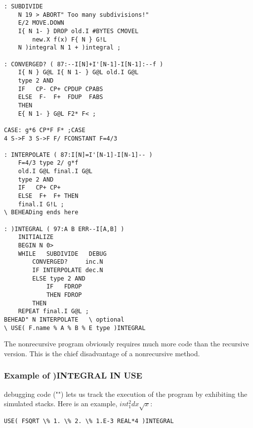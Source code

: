 \begin{lstlisting}
: SUBDIVIDE
    N 19 > ABORT" Too many subdivisions!"
    E/2 MOVE.DOWN
    I{ N 1- } DROP old.I #BYTES CMOVEL
        new.X f(x) F{ N } G!L
    N )integral N 1 + )integral ;

: CONVERGED? ( 87:--I[N]+I'[N-1]-I[N-1]:--f )
    I{ N } G@L I{ N 1- } G@L old.I G@L
    type 2 AND
    IF   CP- CP+ CPDUP CPABS
    ELSE  F-  F+  FDUP  FABS
    THEN
    E{ N 1- } G@L F2* F< ;

CASE: g*6 CP*F F* ;CASE
4 S->F 3 S->F F/ FCONSTANT F=4/3

: INTERPOLATE ( 87:I[N]=I'[N-1]-I[N-1]-- )
    F=4/3 type 2/ g*f
    old.I G@L final.I G@L
    type 2 AND
    IF   CP+ CP+
    ELSE  F+  F+ THEN
    final.I G!L ;
\ BEHEADing ends here

: )INTEGRAL ( 97:A B ERR--I[A,B] )
    INITIALIZE
    BEGIN N 0>
    WHILE   SUBDIVIDE   DEBUG
        CONVERGED?     inc.N
        IF INTERPOLATE dec.N
        ELSE type 2 AND
            IF   FDROP
            THEN FDROP
        THEN
    REPEAT final.I G@L ;
BEHEAD" N INTERPOLATE   \ optional
\ USE( F.name % A % B % E type )INTEGRAL
\end{lstlisting}

The nonrecursive program obviously requires much more code than the recursive version. This is the chief disadvantage of a nonrecursive method.

\subsubsection{Example of )INTEGRAL IN USE}
 debugging code ("") lets us track the execution of the program by exhibiting the simulated stacks. Here is an example, $int_{1}^{2} dx \sqrt{x}$:
\begin{lstlisting}
USE( FSQRT \% 1. \% 2. \% 1.E-3 REAL*4 )INTEGRAL
\end{lstlisting}

